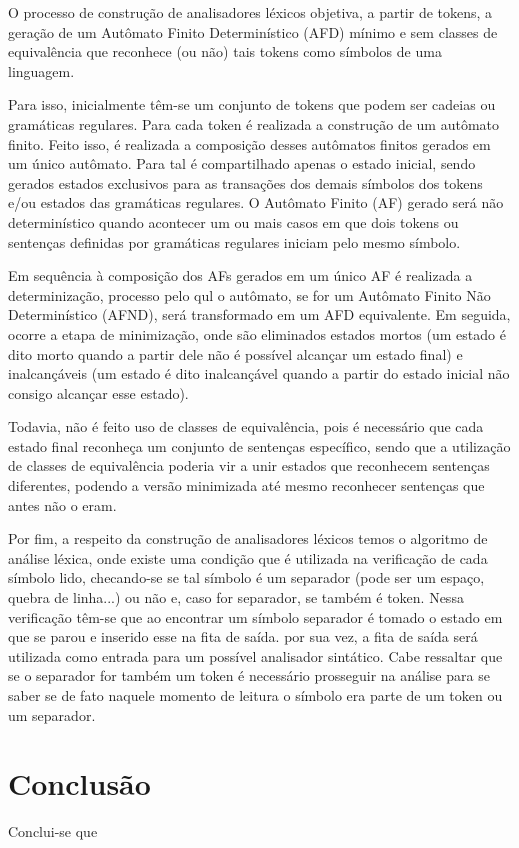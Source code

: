 \documentclass[12pt]{article}
\begin{document}
O processo de construção de analisadores léxicos objetiva, a partir de tokens, a geração de um Autômato Finito Determinístico (AFD) mínimo e sem classes de equivalência que reconhece (ou não) tais tokens como símbolos de uma linguagem.

Para isso, inicialmente têm-se um conjunto de tokens que podem ser cadeias ou gramáticas regulares. Para cada token é realizada a construção de um autômato finito. Feito isso, é realizada a composição desses autômatos finitos gerados em um único autômato. Para tal é compartilhado apenas o estado inicial, sendo gerados estados exclusivos para as transações dos demais símbolos dos tokens e/ou estados das gramáticas regulares. O Autômato Finito (AF) gerado será não determinístico quando acontecer um ou mais casos em que dois tokens ou sentenças definidas por gramáticas regulares iniciam pelo mesmo símbolo.

Em sequência à composição dos AFs gerados em um único AF é realizada a determinização, processo pelo qul o autômato, se for um Autômato Finito Não Determinístico (AFND), será transformado em um AFD equivalente. Em seguida, ocorre a etapa de minimização, onde são eliminados estados mortos (um estado é dito morto quando a partir dele não é possível alcançar um estado final) e inalcançáveis (um estado é dito inalcançável quando a partir do estado inicial não consigo alcançar esse estado).

Todavia, não é feito uso de classes de equivalência, pois é necessário que cada estado final reconheça um conjunto de sentenças específico, sendo que a utilização de classes de equivalência poderia vir a unir estados que reconhecem sentenças diferentes, podendo a versão minimizada até mesmo reconhecer sentenças que antes não o eram.

Por fim, a respeito da construção de analisadores léxicos temos o algoritmo de análise léxica, onde existe uma condição que é utilizada na verificação de cada símbolo lido, checando-se se tal símbolo é um separador (pode ser um espaço, quebra de linha...) ou não e, caso for separador, se também é token. Nessa verificação têm-se que ao encontrar um símbolo separador é tomado o estado em que se parou e inserido esse na fita de saída. por sua vez, a fita de saída será utilizada como entrada para um possível analisador sintático. Cabe ressaltar que se o separador for também um token é necessário prosseguir na análise para se saber se de fato naquele momento de leitura o símbolo era parte de um token ou um separador.

\section{Conclusão}

Conclui-se que 



\end{document}
